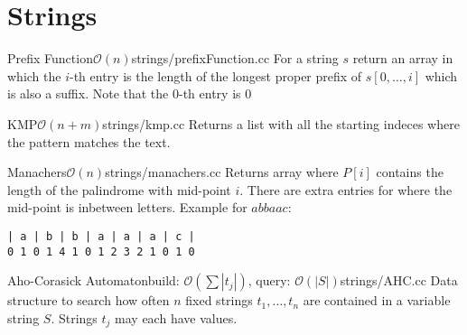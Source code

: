 \section{Strings}

\begin{code}{Prefix Function}{$\mathcal{O}(n)$}{strings/prefixFunction.cc}
  For a string $s$ return an array in which the $i$-th entry is the
  length of the longest proper prefix of $s[0,\ldots, i]$ which is also
  a suffix.  Note that the $0$-th entry is $0$
\end{code}

\begin{code}{KMP}{$\mathcal{O}(n + m)$}{strings/kmp.cc}
  Returns a list with all the starting indeces where the pattern matches
  the text.
\end{code}

\begin{code}{Manachers}{$\mathcal{O}(n)$}{strings/manachers.cc}
Returns array where $P[i]$ contains the length of the palindrome with
mid-point $i$. There are extra entries for where the mid-point is
inbetween letters. Example for $abbaac$:
\begin{verbatim}
| a | b | b | a | a | a | c |
0 1 0 1 4 1 0 1 2 3 2 1 0 1 0
\end{verbatim}
\end{code}

\begin{code}{Aho-Corasick Automaton}{build: $\mathcal{O}(\sum |t_j|)$, query: $\mathcal{O}(|S|)$}{strings/AHC.cc}
  Data structure to search how often $n$ fixed strings $t_1, \dots, t_n$
  are contained in a variable string $S$. Strings $t_j$ may each have
  values.
\end{code}